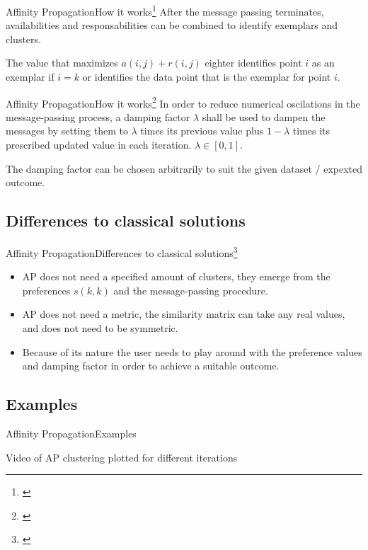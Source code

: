 \documentclass{beamer}
\begin{document}
\begin{frame}{Affinity Propagation}{How it works\footnote{\cite{frey2007clustering}}}
	After the message passing terminates, \alert{availabilities} and \alert{responsabilities} can be combined to identify exemplars and clusters.
	
	The value that maximizes $a(i,j) + r(i,j)$ eighter identifies point $i$ as an exemplar if $i=k$ or identifies the data point that is the exemplar for point $i$.
\end{frame}
\begin{frame}{Affinity Propagation}{How it works\footnote{\cite{frey2007clustering}}}
	In order to reduce numerical oscilations in the message-passing process, a damping factor $\lambda$ shall be used to dampen the messages by setting them to $\lambda$ times its previous value plus $1-\lambda$ times its prescribed updated value in each iteration. $\lambda \in [0,1]$.
	
	The damping factor can be chosen arbitrarily to suit the given dataset / expexted outcome.
\end{frame}

\subsection{Differences to classical solutions}
\begin{frame}{Affinity Propagation}{Differences to classical solutions\footnote{\cite{frey2007clustering}}}
	\begin{itemize}
		\item AP does not need a specified amount of clusters, they emerge from the preferences $s(k,k)$ and the message-passing procedure.
		\item AP does not need a metric, the similarity matrix can take any real values, and does not need to be symmetric.
		\item Because of its nature the user needs to play around with the preference values and damping factor in order to achieve a suitable outcome.
	\end{itemize}
\end{frame}

\subsection{Examples}
\begin{frame}{Affinity Propagation}{Examples}
	\begin{center}
		Video of AP clustering plotted for different iterations
	\end{center}
\end{frame}
\end{document}
